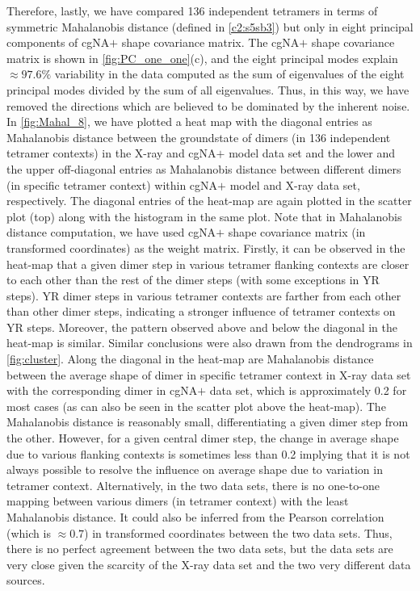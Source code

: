 Therefore, lastly, we have compared 136 independent tetramers in terms of symmetric Mahalanobis distance (defined in \cref{c2:s5sb3}) but only in eight principal components of cgNA$+$ shape covariance matrix. 
The cgNA$+$ shape covariance matrix is shown in \cref{fig:PC_one_one}(c), and the eight principal modes explain $\approx 97.6\%$ variability in the data computed as the sum of eigenvalues of the eight principal modes divided by the sum of all eigenvalues. 
Thus, in this way, we have removed the directions which are believed to be dominated by the inherent noise. %
In \cref{fig:Mahal_8}, we have plotted a heat map with the diagonal entries as Mahalanobis distance between the groundstate of dimers (in 136 independent tetramer contexts) in the X-ray and cgNA$+$ model data set and the lower and the upper off-diagonal entries as Mahalanobis distance between different dimers (in specific tetramer context) within cgNA$+$ model and X-ray data set, respectively. 
The diagonal entries of the heat-map are again plotted in the scatter plot (top) along with the histogram in the same plot.
Note that in Mahalanobis distance computation, we have used cgNA$+$ shape covariance matrix (in transformed coordinates) as the weight matrix. 
Firstly, it can be observed in the heat-map that a given dimer step in various tetramer flanking contexts are closer to each other than the rest of the dimer steps (with some exceptions in YR steps). 
YR dimer steps in various tetramer contexts are farther from each other than other dimer steps, indicating a stronger influence of tetramer contexts on YR steps.
Moreover, the pattern observed above and below the diagonal in the heat-map is similar. 
Similar conclusions were also drawn from the dendrograms in \cref{fig:cluster}.
Along the diagonal in the heat-map are Mahalanobis distance between the average shape of dimer in specific tetramer context in X-ray data set with the corresponding dimer in cgNA$+$ data set, which is approximately 0.2 for most cases (as can also be seen in the scatter plot above the heat-map).
The Mahalanobis distance is reasonably small, differentiating a given dimer step from the other.
However, for a given central dimer step, the change in average shape due to various flanking contexts is sometimes less than 0.2 implying that it is not always possible to resolve the influence on average shape due to variation in tetramer context.
Alternatively, in the two data sets, there is no one-to-one mapping between various dimers (in tetramer context) with the least Mahalanobis distance.
It could also be inferred from the Pearson correlation (which is $\approx 0.7$) in transformed coordinates between the two data sets. 
Thus, there is no perfect agreement between the two data sets, but the data sets are very close given the scarcity of the X-ray data set and the two very different data sources.

